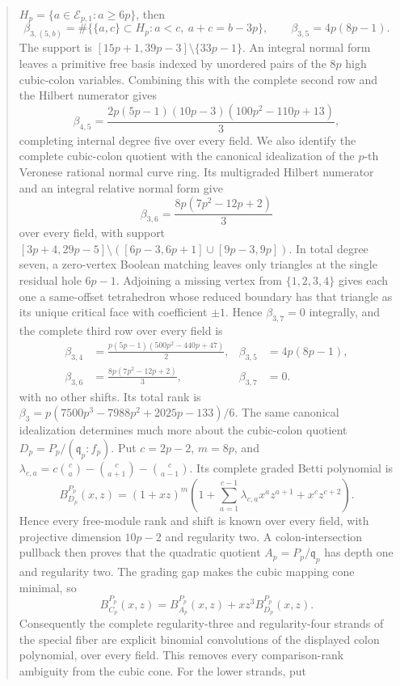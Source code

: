 \documentclass[11pt]{article}
\theoremstyle{definition}
\theoremstyle{remark}
\begin{document}
\begin{abstract}
  \(H_p=\{a\in\mathcal E_{p,1}:a\ge6p\}\), then
  \[
  \beta_{3,(5,b)}=\#\{\{a,c\}\subset H_p:a<c,\ a+c=b-3p\},
  \qquad \beta_{3,5}=4p(8p-1).
  \]
  The support is \([15p+1,39p-3]\setminus\{33p-1\}\). An integral normal form leaves a primitive
  free basis indexed by unordered pairs of the \(8p\) high cubic-colon variables. Combining this
  with the complete second row and the Hilbert numerator gives
  \[
  \beta_{4,5}=\frac{2p(5p-1)(10p-3)(100p^2-110p+13)}{3},
  \]
  completing internal degree five over every field. We also identify the complete cubic-colon
  quotient with the canonical idealization of the $p$-th Veronese rational normal curve ring.
  Its multigraded Hilbert numerator and an integral relative normal form give
  \[
  \beta_{3,6}=\frac{8p(7p^2-12p+2)}{3}
  \]
  over every field, with support
  \([3p+4,29p-5]\setminus([6p-3,6p+1]\cup[9p-3,9p])\). In total degree seven,
  a zero-vertex Boolean matching leaves only triangles at the single residual hole $6p-1$.
  Adjoining a missing vertex from \(\{1,2,3,4\}\) gives each one a same-offset tetrahedron whose
  reduced boundary has that triangle as its unique critical face with coefficient \(\pm1\).
  Hence \(\beta_{3,7}=0\) integrally, and the complete third row over every field is
  \[
  \begin{aligned}
  \beta_{3,4}&=\frac{p(5p-1)(500p^2-440p+47)}2,&
  \beta_{3,5}&=4p(8p-1),\\
  \beta_{3,6}&=\frac{8p(7p^2-12p+2)}3,&
  \beta_{3,7}&=0.
  \end{aligned}
  \]
  with no other shifts. Its total rank is
  \(\beta_3=p(7500p^3-7988p^2+2025p-133)/6\).
  The same canonical idealization determines much more about the cubic-colon quotient
  \(D_p=P_p/(\mathfrak q_p:f_p)\). Put \(c=2p-2\), \(m=8p\), and
  \(\lambda_{c,a}=c\binom ca-\binom c{a+1}-\binom c{a-1}\). Its complete graded Betti polynomial is
  \[
  B_{D_p}^{P_p}(x,z)=(1+xz)^m
  \left(1+\sum_{a=1}^{c-1}\lambda_{c,a}x^az^{a+1}+x^cz^{c+2}\right).
  \]
  Hence every free-module rank and shift is known over every field, with projective dimension
  \(10p-2\) and regularity two. A colon-intersection pullback then proves that the quadratic
  quotient \(A_p=P_p/\mathfrak q_p\) has depth one and regularity two. The grading gap makes the
  cubic mapping cone minimal, so
  \[
  B_{C_p}^{P_p}(x,z)=B_{A_p}^{P_p}(x,z)+xz^3B_{D_p}^{P_p}(x,z).
  \]
  Consequently the complete regularity-three and regularity-four strands of the special fiber are
  explicit binomial convolutions of the displayed colon polynomial, over every field. This removes
  every comparison-rank ambiguity from the cubic cone. For the lower strands, put

\end{abstract}
\end{document}
